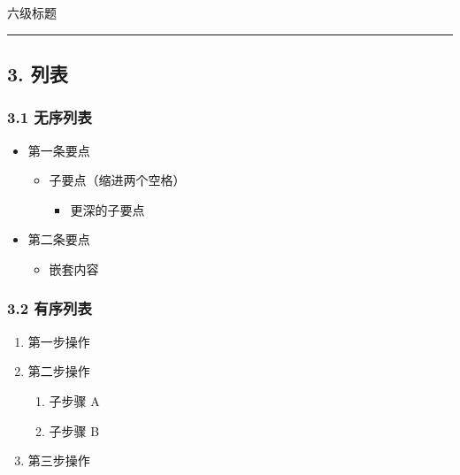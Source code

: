六级标题

\begin{center}\rule{0.5\linewidth}{0.5pt}\end{center}

\subsection{3. 列表}\label{ux5217ux8868}

\subsubsection{3.1 无序列表}\label{ux65e0ux5e8fux5217ux8868}

\begin{itemize}
\tightlist
\item
  第一条要点

  \begin{itemize}
  \tightlist
  \item
    子要点（缩进两个空格）

    \begin{itemize}
    \tightlist
    \item
      更深的子要点
    \end{itemize}
  \end{itemize}
\item
  第二条要点

  \begin{itemize}
  \tightlist
  \item
    嵌套内容
  \end{itemize}
\end{itemize}

\subsubsection{3.2 有序列表}\label{ux6709ux5e8fux5217ux8868}

\begin{enumerate}
\def\labelenumi{\arabic{enumi}.}
\tightlist
\item
  第一步操作
\item
  第二步操作

  \begin{enumerate}
  \def\labelenumii{\arabic{enumii}.}
  \tightlist
  \item
    子步骤 A
  \item
    子步骤 B
  \end{enumerate}
\item
  第三步操作
\end{enumerate}

